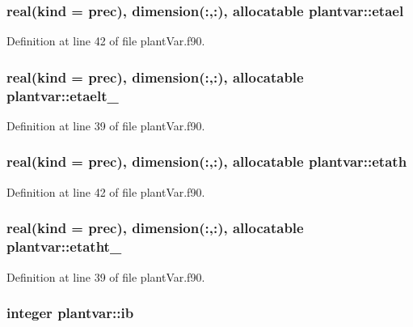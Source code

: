 \hypertarget{classplantvar_a1a1a32a309c970c5ccccda52cbc92e36}{
\subsubsection[{etael}]{\setlength{\rightskip}{0pt plus 5cm}real(kind = prec), dimension(\-:,\-:), allocatable plantvar\-::etael}}\label{classplantvar_a1a1a32a309c970c5ccccda52cbc92e36}


Definition at line 42 of file plant\-Var.\-f90.

\hypertarget{classplantvar_a42c8e330560c87b991b46be04c40a03d}{
\subsubsection[{etaelt\-\_\-}]{\setlength{\rightskip}{0pt plus 5cm}real(kind = prec), dimension(\-:,\-:), allocatable plantvar\-::etaelt\-\_\-}}\label{classplantvar_a42c8e330560c87b991b46be04c40a03d}


Definition at line 39 of file plant\-Var.\-f90.

\hypertarget{classplantvar_a226f4150db308d7f4c46da8f297127af}{
\subsubsection[{etath}]{\setlength{\rightskip}{0pt plus 5cm}real(kind = prec), dimension(\-:,\-:), allocatable plantvar\-::etath}}\label{classplantvar_a226f4150db308d7f4c46da8f297127af}


Definition at line 42 of file plant\-Var.\-f90.

\hypertarget{classplantvar_a355b18c048762925b750fe247a09c4cd}{
\subsubsection[{etatht\-\_\-}]{\setlength{\rightskip}{0pt plus 5cm}real(kind = prec), dimension(\-:,\-:), allocatable plantvar\-::etatht\-\_\-}}\label{classplantvar_a355b18c048762925b750fe247a09c4cd}


Definition at line 39 of file plant\-Var.\-f90.

\hypertarget{classplantvar_a1ee94e03e80cea12dff918a70f1a7993}{
\subsubsection[{ib}]{\setlength{\rightskip}{0pt plus 5cm}integer plantvar\-::ib}}\label{classplantvar_a1ee94e03e80cea12dff918a70f1a7993}


